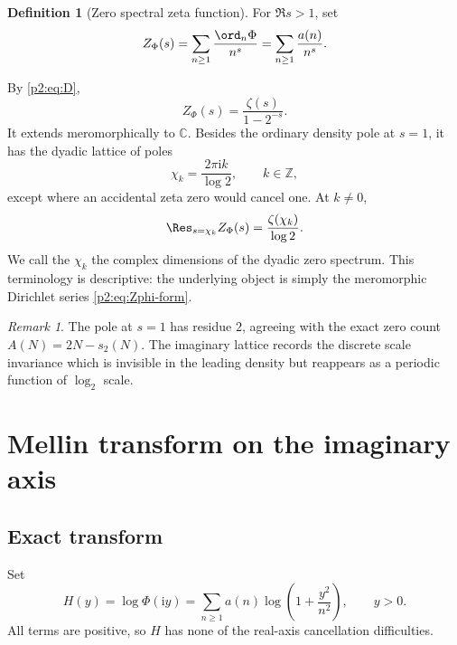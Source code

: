 \documentclass[11pt]{article}
\numberwithin{equation}{section}
\theoremstyle{definition}
\newtheorem{definition}[theorem]{Definition}
\theoremstyle{remark}
\newtheorem{remark}[theorem]{Remark}
\newcommand{\Z}{\mathbb Z}
\newcommand{\C}{\mathbb C}
\newcommand{\ii}{\mathrm i}
\begin{document}
\begin{definition}[Zero spectral zeta function]
For $\Re s>1$, set
\begin{equation}
 Z_\Phi(s)=\sum_{n\ge1}\frac{\ord_n\Phi}{n^s}
          =\sum_{n\ge1}\frac{a(n)}{n^s}.                  \label{p2:eq:Zphi}
\end{equation}
\end{definition}
By \eqref{p2:eq:D},
\begin{equation}
 Z_\Phi(s)=\frac{\zeta(s)}{1-2^{-s}}.                     \label{p2:eq:Zphi-form}
\end{equation}
It extends meromorphically to $\C$.  Besides the ordinary density pole at $s=1$,
it has the dyadic lattice of poles
\begin{equation}
 \chi_k=\frac{2\pi\ii k}{\log2},\qquad k\in\Z,            \label{p2:eq:chi}
\end{equation}
except where an accidental zeta zero would cancel one.  At $k\ne0$,
\begin{equation}
 \Res_{s=\chi_k}Z_\Phi(s)=\frac{\zeta(\chi_k)}{\log2}.    \label{p2:eq:resZ}
\end{equation}
We call the $\chi_k$ the complex dimensions of the dyadic zero spectrum.  This
terminology is descriptive: the underlying object is simply the meromorphic
Dirichlet series \eqref{p2:eq:Zphi-form}.

\begin{remark}
The pole at $s=1$ has residue $2$, agreeing with the exact zero count
$A(N)=2N-s_2(N)$.  The imaginary lattice records the discrete scale invariance
which is invisible in the leading density but reappears as a periodic function
of $\log_2$ scale.
\end{remark}

\section{Mellin transform on the imaginary axis}
\label{p2:sec:mellin}

\subsection{Exact transform}

Set
\begin{equation}
 H(y)=\log\Phi(\ii y)
     =\sum_{n\ge1}a(n)\log\left(1+\frac{y^2}{n^2}\right),
 \qquad y>0.                                               \label{p2:eq:H}
\end{equation}
All terms are positive, so $H$ has none of the real-axis cancellation difficulties.
\end{document}
